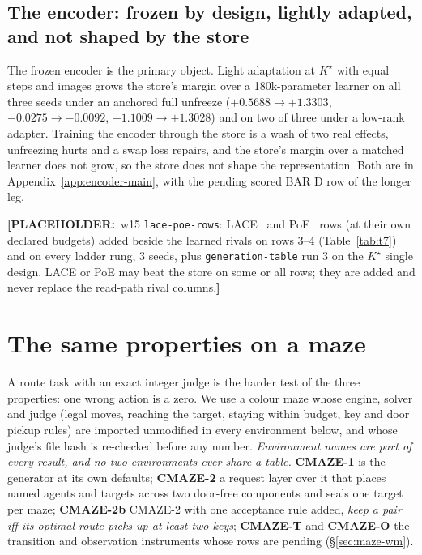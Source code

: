 \documentclass{article} %
\newcommand{\PLACEHOLDER}[1]{{\color{red}\textbf{[PLACEHOLDER:}~#1\textbf{]}}}
\newcommand{\Kstar}{\ensuremath{K^{\star}}}
\begin{document}
\subsection{The encoder: frozen by design, lightly adapted, and not shaped by the store}
\label{sec:adapt}\label{sec:bard}
The frozen encoder is the primary object. Light adaptation at $\Kstar$ with equal steps and
images grows the store's margin over a 180k-parameter learner on all three seeds under an
anchored full unfreeze ($+0.5688\to+1.3303$, $-0.0275\to-0.0092$, $+1.1009\to+1.3028$) and on two
of three under a low-rank adapter. %
Training the encoder through the store is a wash of two real effects, unfreezing hurts and a swap
loss repairs, and the store's margin over a matched learner does not grow, so the store does not
shape the representation. Both are in Appendix~\ref{app:encoder-main}, with the pending scored BAR
D row of the longer leg.

\PLACEHOLDER{w15 \texttt{lace-poe-rows}: LACE~\citep{nie2021controllable} and PoE~\citep{hinton2002training} rows (at their own declared budgets) added
beside the learned rivals on rows 3--4 (Table~\ref{tab:t7}) and on every ladder rung, 3 seeds,
plus \texttt{generation-table} run 3 on the $\Kstar$ single design. LACE or PoE may beat the store
on some or all rows; they are added and never replace the read-path rival columns.}

\section{The same properties on a maze}
\label{sec:maze}

A route task with an exact integer judge is the harder test of the three properties: one
wrong action is a zero. We use a colour maze whose engine, solver and judge (legal moves,
reaching the target, staying within budget, key and door pickup rules) are imported unmodified
in every environment below, and whose judge's file hash is re-checked before any number.
\emph{Environment names are part of every result, and no two environments ever share a
table.}
\textbf{CMAZE-1} is the generator at its own defaults; \textbf{CMAZE-2} a request layer over it
that places named agents and targets across two door-free components and seals one target per
maze; \textbf{CMAZE-2b} CMAZE-2 with one acceptance rule added, \emph{keep a pair iff its optimal
route picks up at least two keys}; \textbf{CMAZE-T} and \textbf{CMAZE-O} the transition and
observation instruments whose rows are pending (\S\ref{sec:maze-wm}).
\end{document}

